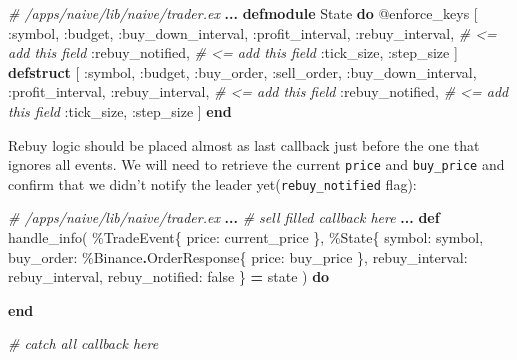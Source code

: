 \documentclass[
]{book}
\newenvironment{Shaded}{\begin{snugshade}}{\end{snugshade}}
\newcommand{\CommentTok}[1]{\textcolor[rgb]{0.56,0.35,0.01}{\textit{#1}}}
\newcommand{\ConstantTok}[1]{\textcolor[rgb]{0.00,0.00,0.00}{#1}}
\newcommand{\KeywordTok}[1]{\textcolor[rgb]{0.13,0.29,0.53}{\textbf{#1}}}
\newcommand{\NormalTok}[1]{#1}
\newcommand{\OperatorTok}[1]{\textcolor[rgb]{0.81,0.36,0.00}{\textbf{#1}}}
\newcommand{\OtherTok}[1]{\textcolor[rgb]{0.56,0.35,0.01}{#1}}
\newcommand{\VariableTok}[1]{\textcolor[rgb]{0.00,0.00,0.00}{#1}}
\begin{document}
\begin{Shaded}
\begin{Highlighting}[]
  \CommentTok{\# /apps/naive/lib/naive/trader.ex}
  \OperatorTok{...}
  \KeywordTok{defmodule} \ConstantTok{State} \KeywordTok{do}
    \OtherTok{@enforce\_keys}\NormalTok{ [}
      \VariableTok{:symbol}\NormalTok{,}
      \VariableTok{:budget}\NormalTok{,}
      \VariableTok{:buy\_down\_interval}\NormalTok{,}
      \VariableTok{:profit\_interval}\NormalTok{,}
      \VariableTok{:rebuy\_interval}\NormalTok{, }\CommentTok{\# \textless{}= add this field}
      \VariableTok{:rebuy\_notified}\NormalTok{, }\CommentTok{\# \textless{}= add this field}
      \VariableTok{:tick\_size}\NormalTok{,}
      \VariableTok{:step\_size}
\NormalTok{    ]}
    \KeywordTok{defstruct}\NormalTok{ [}
      \VariableTok{:symbol}\NormalTok{,}
      \VariableTok{:budget}\NormalTok{,}
      \VariableTok{:buy\_order}\NormalTok{,}
      \VariableTok{:sell\_order}\NormalTok{,}
      \VariableTok{:buy\_down\_interval}\NormalTok{,}
      \VariableTok{:profit\_interval}\NormalTok{,}
      \VariableTok{:rebuy\_interval}\NormalTok{, }\CommentTok{\# \textless{}= add this field}
      \VariableTok{:rebuy\_notified}\NormalTok{, }\CommentTok{\# \textless{}= add this field}
      \VariableTok{:tick\_size}\NormalTok{,}
      \VariableTok{:step\_size}
\NormalTok{    ]}
  \KeywordTok{end}
\end{Highlighting}
\end{Shaded}

Rebuy logic should be placed almost as last callback just before the one that ignores all events. We will need to retrieve the current \texttt{price} and \texttt{buy\_price} and confirm that we didn't notify the leader yet(\texttt{rebuy\_notified} flag):

\begin{Shaded}
\begin{Highlighting}[]
  \CommentTok{\# /apps/naive/lib/naive/trader.ex}
  \OperatorTok{...}
  \CommentTok{\# sell filled callback here}
  \OperatorTok{...}
  \KeywordTok{def}\NormalTok{ handle\_info(}
\NormalTok{        \%}\ConstantTok{TradeEvent}\NormalTok{\{}
          \VariableTok{price:}\NormalTok{ current\_price}
\NormalTok{        \},}
\NormalTok{        \%}\ConstantTok{State}\NormalTok{\{}
          \VariableTok{symbol:}\NormalTok{ symbol,}
          \VariableTok{buy\_order:}\NormalTok{ \%}\ConstantTok{Binance}\OperatorTok{.}\ConstantTok{OrderResponse}\NormalTok{\{}
            \VariableTok{price:}\NormalTok{ buy\_price}
\NormalTok{          \},}
          \VariableTok{rebuy\_interval:}\NormalTok{ rebuy\_interval,}
          \VariableTok{rebuy\_notified:} \ConstantTok{false}
\NormalTok{        \} }\OperatorTok{=}\NormalTok{ state}
\NormalTok{      ) }\KeywordTok{do}

  \KeywordTok{end}

  \CommentTok{\# catch all callback here}
\end{Highlighting}
\end{Shaded}
\end{document}

